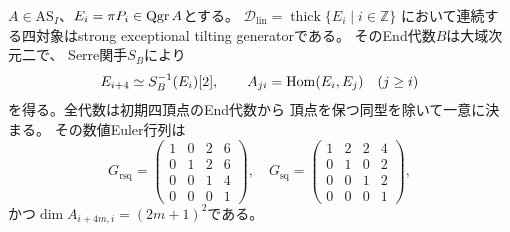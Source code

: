 \begin{lemma}
\label{lem:qa-as-serre-unique-recovery}
$A\in\mathrm{AS}_I$、$E_i=\pi P_i\in\operatorname{Qgr} A$とする。
$\mathcal D_{\mathrm{lin}}=\operatorname{thick}\{E_i\mid i\in\mathbb Z\}$
において連続する四対象はstrong exceptional tilting generatorである。
そのEnd代数$B$は大域次元二で、
Serre関手$S_B$により
\begin{equation}
E_{i+4}\simeq S_B^{-1}(E_i)[2],\qquad
A_{ji}=\operatorname{Hom}(E_i,E_j)\quad(j\ge i)
\label{eq:qa-as-serre-completion}
\end{equation}
を得る。全代数は初期四頂点のEnd代数から
頂点を保つ同型を除いて一意に決まる。
その数値Euler行列は
\[
G_{\mathrm{rsq}}=\begin{pmatrix}
1&0&2&6\\0&1&2&6\\0&0&1&4\\0&0&0&1
\end{pmatrix},\quad
G_{\mathrm{sq}}=\begin{pmatrix}
1&2&2&4\\0&1&0&2\\0&0&1&2\\0&0&0&1
\end{pmatrix},
\]
かつ$\dim A_{i+4m,i}=(2m+1)^2$である。
\end{lemma}
